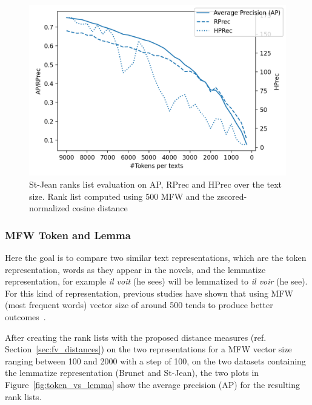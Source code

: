\begin{figure}
  \centering
  \includegraphics[width=\linewidth]{img/degradation.png}
  \caption{St-Jean ranks list evaluation on AP, RPrec and HPrec over the text size. Rank list computed using 500 MFW and the zscored-normalized cosine distance}
  \label{img:degradation}
\end{figure}

\subsubsection{MFW Token and Lemma}
\label{sec:mfw_token_lemma}

Here the goal is to compare two similar text representations, which are the token representation, words as they appear in the novels, and the lemmatize representation, for example \textit{il voit} (he sees) will be lemmatized to \textit{il voir} (he see).
For this kind of representation, previous studies have shown that using MFW (most frequent words) vector size of around 500 tends to produce better outcomes~\cite{savoy_text_representation}.

After creating the rank lists with the proposed distance measures (ref. Section~\ref{sec:fv_distances}) on the two representations for a MFW vector size ranging between 100 and 2000 with a step of 100, on the two datasets containing the lemmatize representation (Brunet and St-Jean), the two plots in Figure~\ref{fig:token_vs_lemma} show the average precision (AP) for the resulting rank lists.

